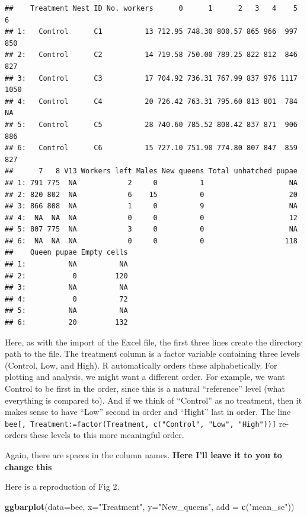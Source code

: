 \documentclass[]{book}
\newenvironment{Shaded}{\begin{snugshade}}{\end{snugshade}}
\newcommand{\KeywordTok}[1]{\textcolor[rgb]{0.13,0.29,0.53}{\textbf{#1}}}
\newcommand{\DataTypeTok}[1]{\textcolor[rgb]{0.13,0.29,0.53}{#1}}
\newcommand{\StringTok}[1]{\textcolor[rgb]{0.31,0.60,0.02}{#1}}
\newcommand{\NormalTok}[1]{#1}
\theoremstyle{definition}
\theoremstyle{definition}
\theoremstyle{definition}
\theoremstyle{remark}
\begin{document}
\begin{verbatim}
##    Treatment Nest ID No. workers      0      1      2   3   4    5    6
## 1:   Control      C1          13 712.95 748.30 800.57 865 966  997  850
## 2:   Control      C2          14 719.58 750.00 789.25 822 812  846  827
## 3:   Control      C3          17 704.92 736.31 767.99 837 976 1117 1050
## 4:   Control      C4          20 726.42 763.31 795.60 813 801  784   NA
## 5:   Control      C5          28 740.60 785.52 808.42 837 871  906  886
## 6:   Control      C6          15 727.10 751.90 774.80 807 847  859  827
##      7   8 V13 Workers left Males New queens Total unhatched pupae
## 1: 791 775  NA            2     0          1                    NA
## 2: 820 802  NA            6    15          0                    20
## 3: 866 808  NA            1     0          9                    NA
## 4:  NA  NA  NA            0     0          0                    12
## 5: 807 775  NA            3     0          0                    NA
## 6:  NA  NA  NA            0     0          0                   118
##    Queen pupae Empty cells
## 1:          NA          NA
## 2:           0         120
## 3:          NA          NA
## 4:           0          72
## 5:          NA          NA
## 6:          20         132
\end{verbatim}

Here, as with the import of the Excel file, the first three lines create
the directory path to the file. The treatment column is a factor
variable containing three levels (Control, Low, and High). R
automatically orders these alphabetically. For plotting and analysis, we
might want a different order. For example, we want Control to be first
in the order, since this is a natural ``reference'' level (what
everything is compared to). And if we think of ``Control'' as no
treatment, then it makes sense to have ``Low'' second in order and
``Hight'' last in order. The line
\texttt{bee{[},\ Treatment:=factor(Treatment,\ c("Control",\ "Low",\ "High")){]}}
re-orders these levels to this more meaningful order.

Again, there are spaces in the column names. \textbf{Here I'll leave it
to you to change this}

Here is a reproduction of Fig 2.

\begin{Shaded}
\begin{Highlighting}[]
\KeywordTok{ggbarplot}\NormalTok{(}\DataTypeTok{data=}\NormalTok{bee, }\DataTypeTok{x=}\StringTok{"Treatment"}\NormalTok{, }\DataTypeTok{y=}\StringTok{"New_queens"}\NormalTok{, }\DataTypeTok{add =} \KeywordTok{c}\NormalTok{(}\StringTok{"mean_se"}\NormalTok{))}
\end{Highlighting}
\end{Shaded}
\end{document}
